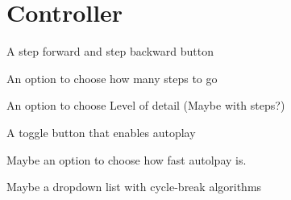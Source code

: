\section{Controller}

\begin{list}{-}{}
\item A step forward and step backward button
\item An option to choose how many steps to go
\item An option to choose Level of detail (Maybe with steps?)
\item A toggle button that enables autoplay
\item Maybe an option to choose how fast autolpay is.
\item Maybe a dropdown list with cycle-break algorithms

\end{list}




